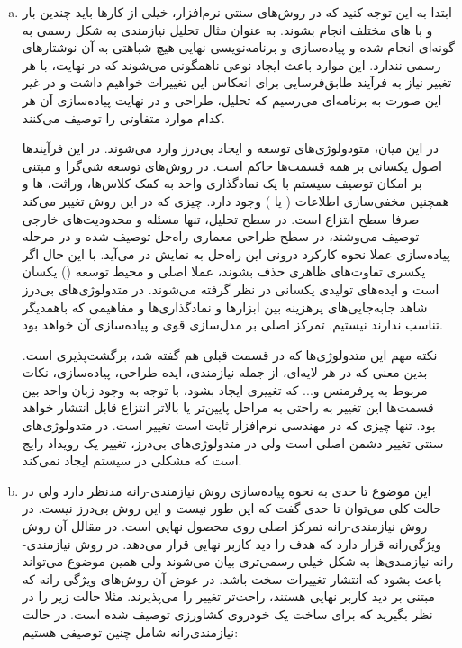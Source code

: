 {\begin{enumerate}[a)]
		\item 
		ابتدا به این توجه کنید که در روش‌های سنتی نرم‌افزار، خیلی از کارها باید چندین بار و با  های مختلف انجام بشوند. به عنوان مثال تحلیل نیازمندی به شکل رسمی به گونه‌ای انجام شده و پیاده‌سازی و برنامه‌نویسی نهایی هیچ شباهتی به آن نوشتارهای رسمی نندارد.  این موارد باعث ایجاد نوعی ناهمگونی می‌شوند که در نهایت، با هر تغییر نیاز به فرآیند طابق‌فرسایی برای انعکاس این تغییرات خواهیم داشت و در غیر این صورت به برنامه‌ای می‌رسیم که تحلیل، طراحی و در نهایت پیاده‌سازی آن هر کدام موارد متفاوتی را توصیف می‌کنند.
		
		در این میان، متودولوژی‌های توسعه و ایجاد بی‌درز وارد می‌شوند. در این فرآیند‌ها اصول یکسانی بر همه قسمت‌ها حاکم است. در روش‌های توسعه شی‌گرا و مبتنی بر امکان توصیف سیستم با یک نمادگذاری واحد به کمک کلاس‌ها، وراثت،  ها و همچنین مخفی‌سازی اطلاعات ( یا ) وجود دارد. چیزی که در این روش تغییر می‌کند صرفا سطح انتزاع است. در سطح تحلیل، تنها مسئله و محدودیت‌های خارجی توصیف می‌وشند، در سطح طراحی معماری راه‌حل توصیف شده و در مرحله پیاده‌سازی عملا نحوه کارکرد درونی این راه‌حل به نمایش در می‌آید. با این حال اگر یکسری تفاوت‌های ظاهری حذف بشوند، عملا  اصلی و محیط توسعه () یکسان است و ایده‌های تولیدی یکسانی در نظر گرفته می‌شوند. در متدولوژی‌های بی‌درز شاهد جابه‌جایی‌های پرهزینه بین ابزارها و نمادگذاری‌ها و مفاهیمی که باهمدیگر تناسب ندارند نیستیم. تمرکز اصلی بر مدل‌سازی قوی و پیاده‌سازی آن خواهد بود.
		
		نکته مهم این متدولوژی‌ها که در قسمت‌ قبلی هم گفته شد، برگشت‌پذیری است. بدین معنی که در هر لایه‌ای، از جمله نیازمندی، ایده طراحی، پیاده‌سازی، نکات مربوط به پرفرمنس و... که تغییری ایجاد بشود، با توجه به وجود زبان واحد بین قسمت‌ها این تغییر به راحتی به مراحل پایین‌تر یا بالاتر انتزاع قابل انتشار خواهد بود. تنها چیزی که در مهندسی نرم‌افزار ثابت است تغییر است. در متدولوژی‌های سنتی تغییر دشمن اصلی است ولی در متدولوژی‌های بی‌درز، تغییر یک رویداد رایج است که مشکلی در سیستم ایجاد نمی‌کند.
		
		
	
		\item
این موضوع تا حدی به نحوه پیاده‌سازی روش نیازمندی-رانه مدنظر دارد ولی در حالت کلی می‌توان تا حدی گفت که این طور نیست و این روش بی‌درز نیست. در روش نیازمندی-رانه تمرکز اصلی روی محصول نهایی است. در مقالل آن روش ویژگی‌رانه قرار دارد که هدف را دید کاربر نهایی قرار می‌دهد. در روش نیازمندی-رانه نیازمندی‌ها به شکل خیلی رسمی‌تری بیان می‌شوند ولی همین موضوع می‌تواند باعث بشود که انتشار تغییرات سخت باشد. در عوض آن روش‌های ویژگی-رانه که مبتنی بر دید کاربر نهایی هستند، راحت‌تر تغییر را می‌پذیرند. مثلا حالت زیر را در نظر بگیرید که برای ساخت یک خودروی کشاورزی توصیف شده است. در حالت نیازمندی‌رانه شامل چنین توصیفی هستیم:


\end{enumerate}}
